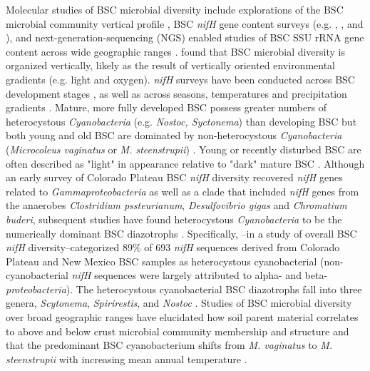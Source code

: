 Molecular studies of BSC microbial diversity include explorations of the BSC
microbial community vertical profile \citep{Garcia_Pichel_2003}, BSC
\textit{nifH} gene content surveys (e.g. \citet{14766579}, \citet{Yeager_2012},
\citet{Yeager} and \citet{Steppe_1996}), and next-generation-sequencing (NGS)
enabled studies of BSC SSU rRNA gene content across wide geographic ranges
\citep{Garcia_Pichel_2013, Steven_2013}. \citet{Garcia_Pichel_2003} found that
BSC microbial diversity is organized vertically, likely as the result of
vertically oriented environmental gradients (e.g. light and oxygen).
\textit{nifH} surveys have been conducted across BSC development stages
\citep{14766579}, as well as across seasons, temperatures and precipitation
gradients \citep{Yeager_2012}. Mature, more fully developed BSC possess greater
numbers of heterocystous \textit{Cyanobacteria} (e.g. \textit{Nostoc, Syctonema}) than
developing BSC but both young and old BSC are dominated by non-heterocystous
\textit{Cyanobacteria} (\textit{Microcoleus vaginatus} or \textit{M. steenstrupii})
\citep{14766579, Garcia_Pichel_2013}. Young or recently disturbed BSC are often
described as "light" in appearance relative to "dark" mature BSC
\citep{Belnap_2002, 14766579}.  Although an early survey of Colorado Plateau BSC
\textit{nifH} diversity recovered \textit{nifH} genes related to
\textit{Gammaproteobacteria} as well as a clade that included \textit{nifH}
genes from the anaerobes \textit{Clostridium pssteurianum},
\textit{Desulfovibrio gigas} and \textit{Chromatium buderi}, subsequent studies
have found heterocystous \textit{Cyanobacteria} to be the numerically dominant BSC
diazotrophs \citep{Yeager, 14766579, Yeager_2012}. Specifically,
\citet{Yeager}--in a study of overall BSC \textit{nifH} diversity--categorized
89\% of 693 \textit{nifH} sequences derived from Colorado Plateau and New
Mexico BSC samples as heterocystous cyanobacterial (non-cyanobacterial
\textit{nifH} sequences were largely attributed to alpha- and beta-
\textit{proteobacteria}). The heterocystous cyanobacterial BSC diazotrophs fall
into three genera, \textit{Scytonema}, \textit{Spirirestis}, and
\textit{Nostoc} \citep{Yeager, Yeager_2012}. Studies of BSC microbial diversity
over broad geographic ranges have elucidated how soil parent material
correlates to above and below crust microbial community membership and
structure \citep{Steven_2013} and that the predominant BSC cyanobacterium shifts
from \textit{M. vaginatus} to \textit{M. steenstrupii} with increasing mean
annual temperature \citep{Garcia_Pichel_2013}.

